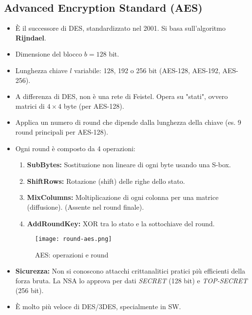 \documentclass[../main.tex]{subfiles}
\begin{document}
\subsection{Advanced Encryption Standard (AES)}
\begin{itemize}
	\item È il successore di DES, standardizzato nel 2001. Si basa sull'algoritmo \textbf{Rijndael}.
	\item Dimensione del blocco $b=128$ bit.
	\item Lunghezza chiave $l$ variabile: 128, 192 o 256 bit (AES-128, AES-192, AES-256).
	\item A differenza di DES, non è una rete di Feistel. Opera su "stati", ovvero matrici di $4 \times 4$ byte (per AES-128).
	\item Applica un numero di round che dipende dalla lunghezza della chiave (es. 9 round principali per AES-128).
	\item Ogni round è composto da 4 operazioni:
	      \begin{enumerate}
	      	\item \textbf{SubBytes:} Sostituzione non lineare di ogni byte usando una S-box.
	      	\item \textbf{ShiftRows:} Rotazione (shift) delle righe dello stato.
	      	\item \textbf{MixColumns:} Moltiplicazione di ogni colonna per una matrice (diffusione). (Assente nel round finale).
	      	\item \textbf{AddRoundKey:} XOR tra lo stato e la sottochiave del round.
	      \end{enumerate}
	                
	      \begin{figure}[H]
	      	\centering
	      	\texttt{[image: round-aes.png]}
	      	\caption{AES: operazioni e round}
	      	\label{fig:etichetta}
	      \end{figure}
	          
	\item \textbf{Sicurezza:} Non si conoscono attacchi crittanalitici pratici più efficienti della forza bruta. La NSA lo approva per dati \emph{SECRET} (128 bit) e \emph{TOP-SECRET} (256 bit).
	\item È molto più veloce di DES/3DES, specialmente in SW.
\end{itemize}
\end{document}
